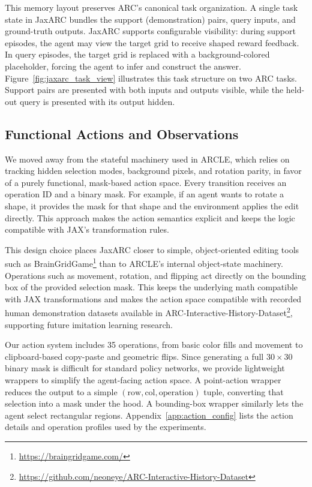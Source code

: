 This memory layout preserves ARC's canonical task organization. A single task state in JaxARC bundles the support (demonstration) pairs, query inputs, and ground-truth outputs. JaxARC supports configurable visibility: during support episodes, the agent may view the target grid to receive shaped reward feedback. In query episodes, the target grid is replaced with a background-colored placeholder, forcing the agent to infer and construct the answer. Figure~\ref{fig:jaxarc_task_view} illustrates this task structure on two ARC tasks. Support pairs are presented with both inputs and outputs visible, while the held-out query is presented with its output hidden.


\subsection{Functional Actions and Observations}

We moved away from the stateful machinery used in ARCLE, which relies on tracking hidden selection modes, background pixels, and rotation parity, in favor of a purely functional, mask-based action space. Every transition receives an operation ID and a binary mask. For example, if an agent wants to rotate a shape, it provides the mask for that shape and the environment applies the edit directly. This approach makes the action semantics explicit and keeps the logic compatible with JAX's transformation rules.

This design choice places JaxARC closer to simple, object-oriented editing tools such as BrainGridGame\footnote{\url{https://braingridgame.com/}} than to ARCLE's internal object-state machinery. Operations such as movement, rotation, and flipping act directly on the bounding box of the provided selection mask. This keeps the underlying math compatible with JAX transformations and makes the action space compatible with recorded human demonstration datasets available in ARC-Interactive-History-Dataset\footnote{\url{https://github.com/neoneye/ARC-Interactive-History-Dataset}}, supporting future imitation learning research.

Our action system includes 35 operations, from basic color fills and movement to clipboard-based copy-paste and geometric flips. Since generating a full $30 \times 30$ binary mask is difficult for standard policy networks, we provide lightweight wrappers to simplify the agent-facing action space. A point-action wrapper reduces the output to a simple $(\text{row}, \text{col}, \text{operation})$ tuple, converting that selection into a mask under the hood. A bounding-box wrapper similarly lets the agent select rectangular regions. Appendix~\ref{app:action_config} lists the action details and operation profiles used by the experiments.

